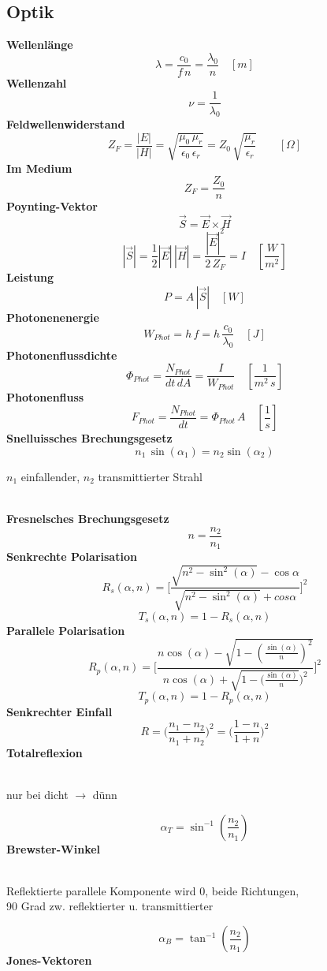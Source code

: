 \documentclass[12pt,a4paper,oneside]{article}
\begin{document}
	\subsection*{Optik}
	\begin{multicols}{2}
		\textbf{Wellenlänge} $$\lambda=\frac{c_0}{f\, n} = \frac{\lambda_0}{n}\quad[m]$$
		\textbf{Wellenzahl} $$\nu = \frac{1}{\lambda_0}$$
		\textbf{Feldwellenwiderstand} $$Z_F=\frac{|E|}{|H|}=\sqrt{\frac{\mu_0 \, \mu_r}{\epsilon_0 \, \epsilon_r}}= Z_0 \, \sqrt{\frac{\mu_r}{\epsilon_r}} \qquad[\Omega]$$
		\textbf{Im Medium} $$Z_F = \frac{Z_0}{n}$$
		\textbf{Poynting-Vektor} $$\vec{S}=\vec{E}\times\vec{H}$$ $$|\vec{S}|=\frac{1}{2}|\vec{E}|\,|\vec{H}|=\frac{|\vec{E}|^2}{2\,Z_F}=I\quad [\frac{W}{m^2}]$$
		\textbf{Leistung} $$P= A\, |\vec{S}|\quad [W]$$
		\textbf{Photonenenergie} $$W_{Phot}= h\,f=h\, \frac{c_0}{\lambda_0}\quad [J]$$
		\textbf{Photonenflussdichte} $$\Phi_{Phot}=\frac{N_{Phot}}{dt\,dA} = \frac{I}{W_{Phot}} \quad [\frac{1}{m^2\, s}]$$ 
		\textbf{Photonenfluss} $$F_{Phot} = \frac{N_{Phot }}{dt}= \Phi_{Phot} \, A \quad [\frac{1}{s}]	$$
 	\textbf{Snelluissches Brechungsgesetz}$$n_1 \, \sin(\alpha_1) = n_2 \sin(\alpha_2)$$\begin{tiny}
		$n_1$ einfallender, $n_2$ transmittierter Strahl
	\end{tiny}\\
	\textbf{Fresnelsches Brechungsgesetz }$$n = \frac{n_2 }{n_1}$$\textbf{Senkrechte Polarisation}$$R_s(\alpha, n)= \bigg[\frac{\sqrt{n^2 - \sin^2(\alpha)}-\cos{\alpha}}{\sqrt{n^2 - \sin^2(\alpha)}+cos{\alpha}}\bigg]^2$$ $$T_s(\alpha, n) = 1- R_s(\alpha, n)$$
	\textbf{Parallele Polarisation} $$R_p(\alpha, n) = \bigg[\frac{n \cos(\alpha)-\sqrt{1-(\frac{\sin(\alpha)}{n})^2}}{n \cos(\alpha)+\sqrt{1-(\frac{\sin(\alpha)}{n}})^2}\bigg]^2$$ $$T_p(\alpha, n) = 1 - R_p(\alpha, n)$$
	\textbf{Senkrechter Einfall}
	$$R = \big( \frac{n_1 - n_2}{n_1 + n_2}\big)^2 = \big( \frac{1- n }{1 + n}\big)^2$$
	\textbf{Totalreflexion} \begin{tiny}\\nur bei dicht $\rightarrow$ dünn
	\end{tiny}$$ \alpha_T = \sin^{-1}(\frac{n_2}{n_1})$$
	\textbf{Brewster-Winkel }\begin{tiny}\\Reflektierte parallele Komponente wird 0, beide Richtungen, \\ 90 Grad zw. reflektierter u. transmittierter
	\end{tiny}$$\alpha_B = \tan^{-1}(\frac{n_2}{n_1})$$
\textbf{Jones-Vektoren}

\end{multicols}
\end{document}
